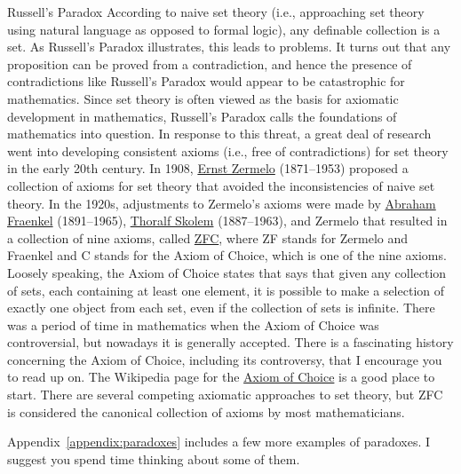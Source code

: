 \begin{section}{Russell's Paradox}
According to naive set theory (i.e., approaching set theory using natural language as opposed to formal logic), any definable collection is a set. As Russell's Paradox illustrates, this leads to problems.  It turns out that any proposition can be proved from a contradiction, and hence the presence of contradictions like Russell's Paradox would appear to be catastrophic for mathematics.  Since set theory is often viewed as the basis for axiomatic development in mathematics, Russell's Paradox calls the foundations of mathematics into question. In response to this threat, a great deal of research went into developing consistent axioms (i.e., free of contradictions) for set theory in the early 20th century. In 1908, \href{https://en.wikipedia.org/wiki/Ernst_Zermelo}{Ernst Zermelo} (1871--1953) proposed a collection of axioms for set theory that avoided the inconsistencies of naive set theory. In the 1920s, adjustments to Zermelo's axioms were made by \href{https://en.wikipedia.org/wiki/Abraham_Fraenkel}{Abraham Fraenkel} (1891--1965), \href{https://en.wikipedia.org/wiki/Thoralf_Skolem}{Thoralf Skolem} (1887--1963), and Zermelo that resulted in a collection of nine axioms, called \href{https://en.wikipedia.org/wiki/Zermelo-Fraenkel_set_theory}{ZFC}, where ZF stands for Zermelo and Fraenkel and C stands for the Axiom of Choice, which is one of the nine axioms. Loosely speaking, the Axiom of Choice states that says that given any collection of sets, each containing at least one element, it is possible to make a selection of exactly one object from each set, even if the collection of sets is infinite. There was a period of time in mathematics when the Axiom of Choice was controversial, but nowadays it is generally accepted.  There is a fascinating history concerning the Axiom of Choice, including its controversy, that I encourage you to read up on.  The Wikipedia page for the \href{https://en.wikipedia.org/wiki/Axiom_of_choice}{Axiom of Choice} is a good place to start. There are several competing axiomatic approaches to set theory, but ZFC is considered the canonical collection of axioms by most mathematicians.

Appendix~\ref{appendix:paradoxes} includes a few more examples of paradoxes.  I suggest you spend time thinking about some of them.

\end{section}